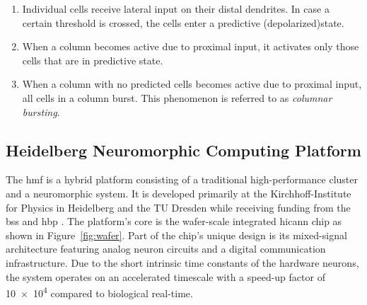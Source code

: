 \begin{enumerate}

	\item Individual cells receive lateral input on their distal dendrites. In
	case a certain threshold is crossed, the cells enter a predictive
	(depolarized)state.

	\item\label{enm:temporal_memory_predictive} When a column becomes active due
	to proximal input, it activates only those cells that are in predictive state.

	\item\label{enm:temporal_memory_bursting} When a column with no predicted
	cells becomes active due to proximal input, all cells in a column burst. This
	phenomenon is referred to as \emph{columnar bursting}.

\end{enumerate}

\subsection{Heidelberg Neuromorphic Computing Platform}

The \gls{hmf} is a hybrid platform consisting of a traditional high-performance
cluster and a neuromorphic system. It is developed primarily at the
Kirchhoff-Institute for Physics in Heidelberg and the TU Dresden while receiving
funding from the \gls{bss} and \gls{hbp} \citep{hbp2014sp9spec}. The platform's
core is the wafer-scale integrated \gls{hicann} chip as shown in
Figure~\ref{fig:wafer}. Part of the chip's unique design is its mixed-signal
architecture featuring analog neuron circuits and a digital communication
infrastructure. Due to the short intrinsic time constants of the hardware
neurons, the system operates on an accelerated timescale with a speed-up factor
of \num{10e4} compared to biological real-time.

